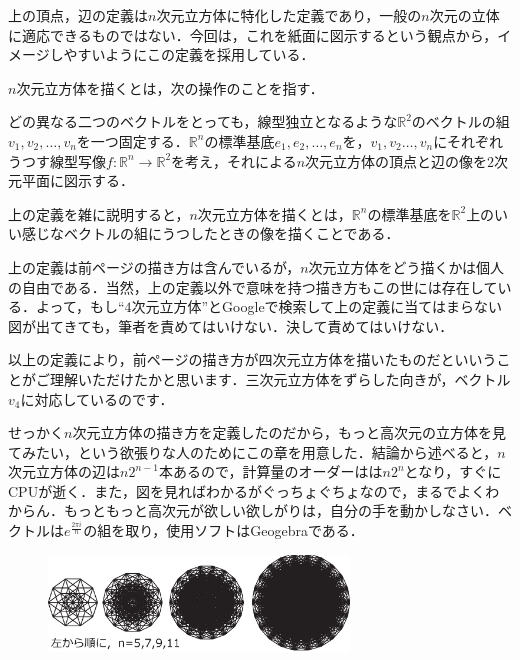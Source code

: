 \documentclass[./main]{subfiles} %
\begin{document}
\rem
上の頂点，辺の定義は$n$次元立方体に特化した定義であり，一般の$n$次元の立体に適応できるものではない．今回は，これを紙面に図示するという観点から，イメージしやすいようにこの定義を採用している．

\maskdefi [$n$次元立方体を描く]

$n$次元立方体を描くとは，次の操作のことを指す．

どの異なる二つのベクトルをとっても，線型独立となるような$\mathbb{R}^2$のベクトルの組$v_1, v_2 , \ldots , v_n$を一つ固定する．$\mathbb{R}^n$の標準基底$e_1 , e_2 , \ldots , e_n$を，$v_1,v_2 \ldots ,v_n$にそれぞれうつす線型写像$f \colon \mathbb{R}^n \rightarrow \mathbb{R}^2$を考え，それによる$n$次元立方体の頂点と辺の像を$2$次元平面に図示する．

\rem
上の定義を雑に説明すると，$n$次元立方体を描くとは，$\mathbb{R}^n$の標準基底を$\mathbb{R}^2$上のいい感じなベクトルの組にうつしたときの像を描くことである．

\rem

上の定義は前ページの描き方は含んでいるが，$n$次元立方体をどう描くかは個人の自由である．当然，上の定義以外で意味を持つ描き方もこの世には存在している．よって，もし``$4$次元立方体''とGoogleで検索して上の定義に当てはまらない図が出てきても，筆者を責めてはいけない．決して責めてはいけない．

以上の定義により，前ページの描き方が四次元立方体を描いたものだといいうことがご理解いただけたかと思います．三次元立方体をずらした向きが，ベクトル$v_4$に対応しているのです．

せっかく$n$次元立方体の描き方を定義したのだから，もっと高次元の立方体を見てみたい，という欲張りな人のためにこの章を用意した．結論から述べると，$n$次元立方体の辺は$n2^{n-1}$本あるので，計算量のオーダーはは$n2^n$となり，すぐに{\rm CPU}が逝く．また，図を見ればわかるがぐっちょぐちょなので，まるでよくわからん．もっともっと高次元が欲しい欲しがりは，自分の手を動かしなさい．ベクトルは$e^{\frac{2\pi i}{n}}$の組を取り，使用ソフトは{\rm Geogebra}である．

\begin{figure}[h]
\begin{center}
\includegraphics[width=80mm]{mask_rittai4.eps}
\end{center}
\end{figure}
\end{document}
